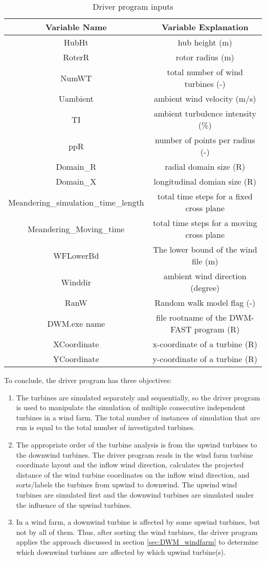 \documentclass{umthesis}
\begin{document}
\begin{table}[ht]
\caption{Driver program inputs}
\label{t:Driver_input}
\centering
\begin{tabular}{c c}
\hline\hline
Variable Name & Variable Explanation\\ [0.5ex]
\hline
HubHt & hub height (m)\\
RoterR & rotor radius (m)\\
NumWT & total number of wind turbines (-)\\
Uambient & ambient wind velocity (m/s)\\
TI & ambient turbulence intensity (\%)\\
ppR & number of points per radius (-)\\
Domain\_R & radial domain size (R)\\
Domain\_X & longitudinal domian size (R)\\
Meandering\_simulation\_time\_length &total time steps for a fixed cross plane  \\
Meandering\_Moving\_time &total time steps for a moving cross plane \\
WFLowerBd & The lower bound of the wind file (m)\\
Winddir & ambient wind direction (degree)\\
RanW & Random walk model flag (-)\\
DWM.exe name & file rootname of the DWM-FAST program (R)\\
XCoordinate & x-coordinate of a turbine (R)\\
YCoordinate & y-coordinate of a turbine (R)\\ [1ex]
\hline %
\end{tabular}
\label{table:nonlin} %
\end{table}


To conclude, the driver program has three objectives:
 \begin{enumerate}
   \item The turbines are simulated separately and sequentially, so the driver program is used to manipulate the simulation of multiple consecutive independent turbines in a wind farm. The total number of instances of simulation that are run is equal to the total number of investigated turbines.
   \item The appropriate order of the turbine analysis is from the upwind turbines to the downwind turbines. The driver program reads in the wind farm turbine coordinate layout and the inflow wind direction, calculates the projected distance of the wind turbine coordinates on the inflow wind direction, and sorts/labels the turbines from upwind to downwind. The upwind wind turbines are simulated first and the downwind turbines are simulated under the influence of the upwind turbines.
   \item In a wind farm, a downwind turbine is affected by some upwind turbines, but not by all of them. Thus, after sorting the wind turbines, the driver program applies the approach discussed in section \ref{sec:DWM_windfarm} to determine which downwind turbines are affected by which upwind turbine(s).
 \end{enumerate}
\end{document}
